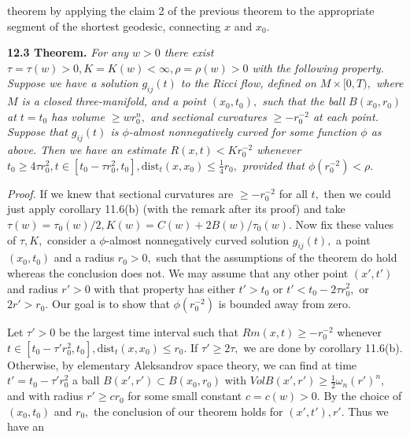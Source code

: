\documentclass[12pt]{article}
\theoremstyle{plain}
{\swapnumbers
\newtheorem{thm}{Theorem}[section]
\newtheorem{cor}[thm]{Corollary}
\newtheorem{lem}[thm]{Lemma}
\newtheorem{prop}[thm]{Proposition}
}
\theoremstyle{definition}
{\swapnumbers
\newtheorem{defn}[thm]{Definition}
\newtheorem{nota}[thm]{Notation}
\newtheorem{parag}[thm]{}
\newtheorem*{parstr}{\addtocounter{thm}{1}\thesection.\arabic{thm}*}
\newtheorem*{intropar}{\addtocounter{thm}{1}\arabic{thm}}
}
\theoremstyle{remark} {\swapnumbers
\newtheorem{rem}[thm]{Remark}
\newtheorem{exam}[thm]{Example}
\newtheorem{lemma}[thm]{Lemma}
\newtheorem{claim}[thm]{Claim}
}
\numberwithin{equation}{section}
\begin{document}
            theorem by applying the claim 2 of the previous
            theorem to the appropriate segment of the shortest
            geodesic, connecting $x$ and $x_0.$
            \par {\bf 12.3 Theorem.} {\it For any $w>0$ there exist
            $\tau=\tau(w)>0, K=K(w)<\infty, \rho=\rho(w)>0$ with
            the following property. Suppose we have a solution
            $g_{ij}(t)$ to the Ricci flow, defined on $M\times
            [0,T),$ where $M$ is a closed three-manifold, and a point $(x_0,t_0),$
            such that the ball $B(x_0,r_0)$ at $t=t_0$ has volume
            $\ge wr_0^n,$ and sectional curvatures $\ge -r_0^{-2}$
            at each point. Suppose that $g_{ij}(t)$ is
            $\phi$-almost nonnegatively curved for some function
            $\phi$ as above. Then we have an estimate
            $R(x,t)<Kr_0^{-2}$ whenever $t_0\ge 4\tau r_0^2, t\in
            [t_0-\tau r_0^2,t_0], \mbox{dist}_t(x,x_0)\le
            \frac{1}{4}r_0,$ provided that $\phi(r_0^{-2})<\rho.$}
            \par {\it Proof.}  If we knew that sectional curvatures are
            $\ge -r_0^{-2}$ for all $t,$ then we could just apply
            corollary 11.6(b) (with the remark after its proof) and take $\tau(w)=\tau_0(w)/2,
            K(w)=C(w)+2B(w)/\tau_0(w).$ Now fix these values of
            $\tau ,K,$ consider a $\phi$-almost nonnegatively
            curved solution $g_{ij}(t),$  a point $(x_0,t_0)$
            and a radius $r_0>0,$ such that the assumptions of the
            theorem do hold whereas the conclusion does not. We
            may assume that any other point $(x',t')$ and radius
            $r'>0$ with that property has either $t'>t_0$ or
            $t'<t_0 -2\tau r_0^2,$ or $2r'>r_0.$ Our goal is to
            show that $\phi(r_0^{-2})$ is bounded away from zero.
            \par Let $\tau '>0 $ be the largest time interval such
            that $Rm(x,t)\ge -r_0^{-2}$ whenever $t\in[t_0-\tau
            'r_0^2,t_0], \mbox{dist}_t(x,x_0)\le r_0.$ If $\tau
            '\ge 2\tau,$ we are done by corollary 11.6(b). Otherwise,
            by elementary Aleksandrov space theory, we can find at
            time $t'=t_0-\tau 'r_0^2$ a ball $B(x',r')\subset
            B(x_0,r_0)$ with $VolB(x',r')\ge
            \frac{1}{2}\omega_n(r')^n,$ and with radius $r'\ge
            cr_0$ for some small constant $c=c(w)>0.$ By the
            choice of $(x_0,t_0)$ and $r_0,$ the conclusion of our
            theorem holds for $(x',t'),r'.$ Thus we have an
\end{document}
